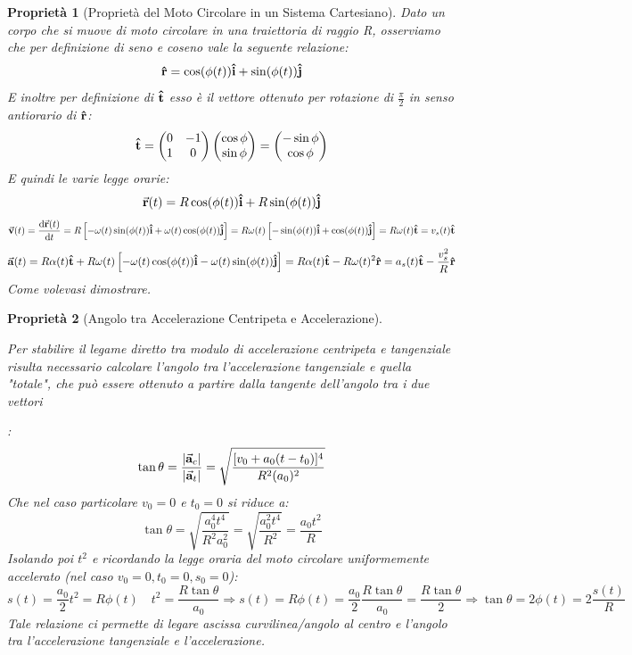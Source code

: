 \documentclass{article}
\newtheorem{property}{Proprietà}[section]
\newcommand{\then}{\ensuremath{\Rightarrow}}
\renewcommand{\i}{\vu{i}}
\renewcommand{\j}{\vu{j}}
\renewcommand{\a}{\va{a}}
\renewcommand{\v}{\va{v}}
\newcommand{\verst}{\vu{t}}
\newcommand{\versr}{\vu{r}}
\renewcommand{\r}{\va{r}}
\begin{document}
\begin{property}[Proprietà del Moto Circolare in un Sistema Cartesiano]
Dato un corpo che si muove di moto circolare in una traiettoria di raggio R, osserviamo che per definizione di seno e coseno vale la seguente relazione:
\[\versr=\cos(\phi(t))\i+\sin(\phi(t))\j\]
E inoltre per definizione di $\verst$ esso è il vettore ottenuto per rotazione di $\frac{\pi}{2}$ in senso antiorario di $\versr$:
\[\verst=\begin{pmatrix}0&-1\\1&0\\\end{pmatrix}\begin{pmatrix}\cos\phi\\\sin\phi\end{pmatrix}=\begin{pmatrix}-\sin\phi\\\cos\phi\\\end{pmatrix}\]
E quindi le varie legge orarie:
\[\r(t)=R\cos(\phi(t))\i+R\sin(\phi(t))\j\]
\[\v(t)=\dv{\r(t)}{t}=R\left[-\omega(t)\sin(\phi(t))\i+\omega(t)\cos(\phi(t))\j\right]=R\omega(t)\left[-\sin(\phi(t))\i+\cos(\phi(t))\j\right]=R\omega(t)\verst=v_s(t)\verst\]
\[\a(t)=R\alpha(t)\verst+R\omega(t)\left[-\omega(t)\cos(\phi(t))\i-\omega(t)\sin(\phi(t))\j\right]=R\alpha(t)\verst-R\omega(t)^2\versr=a_s(t)\verst-\frac{v_s^2}{R}\versr\]
Come volevasi dimostrare.
\end{property}

\begin{property}[Angolo tra Accelerazione Centripeta e Accelerazione]
\hypertarget{angoloaccmotocirc}{Per stabilire il legame diretto tra modulo di accelerazione centripeta e tangenziale risulta necessario calcolare l'angolo tra l'accelerazione tangenziale e quella "totale", che può essere ottenuto a partire dalla tangente dell'angolo tra i due vettori}:
\[\tan\theta=\frac{|\a_c|}{|\a_t|}=\sqrt{\frac{[v_0+a_0(t-t_0)]^4}{R^2(a_0)^2}}\]
Che nel caso particolare $v_0=0$ e $t_0=0$ si riduce a:
\[\tan\theta=\sqrt{\frac{a_0^4t^4}{R^2a_0^2}}=\sqrt{\frac{a_0^2t^4}{R^2}}=\frac{a_0t^2}{R}\]
Isolando poi $t^2$ e ricordando la legge oraria del moto circolare uniformemente accelerato (nel caso $v_0=0,t_0=0,s_0=0$):
\[s(t)=\frac{a_0}{2}t^2=R\phi(t)\quad t^2=\frac{R\tan\theta}{a_0}\then s(t)=R\phi(t)=\frac{a_0}{2}\frac{R\tan\theta}{a_0}=\frac{R\tan\theta}{2}\then \tan\theta=2\phi(t)=2\frac{s(t)}{R}\]
Tale relazione ci permette di legare ascissa curvilinea/angolo al centro e l'angolo tra l'accelerazione tangenziale e l'accelerazione.
\end{property}
\end{document}

